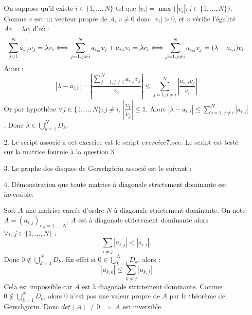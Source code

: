 \documentclass[a4paper,11pt]{article}
\begin{document}
	On suppose qu'il existe $i \in \{1, ..., N\}$ tel que $|v_{i}| = \max \{ |v_{j}| : j \in \{1, ..., N\}\}$. Comme $v$ est un vecteur propre de $A$, $v \neq 0$ donc $|v_{i}| > 0$, et $v$ vérifie l'égalité $Av = \lambda v$, d'où :
	\begin{equation*}
		\sum_{j = 1}^{N} a_{i, j} v_{j} = \lambda v_{i}
		\Longleftrightarrow \sum_{j = 1, j \neq i}^{N} a_{i, j} v_{j} + a_{i, i} v_{i}= \lambda v_{i} \\
		\Longleftrightarrow \sum_{j = 1, j \neq i}^{N} a_{i, j} v_{j} = (\lambda - a_{i, i}) v_{i}
	\end{equation*}
	Ainsi :
	\begin{equation*}
		|\lambda - a_{i, i}| = \left|\frac{\sum\limits_{j = 1, j \neq i}^{N} a_{i, j} v_{j}}{v_{i}} \right|
		\leqslant \sum_{j = 1, j \neq i}^{N} \left|\frac{a_{i, j} v_{j}}{v_{i}} \right|
	\end{equation*}
	Or par hypothèse $\forall j \in \{1, ..., N\} : j \neq i$, $\left|\dfrac{v_{i}}{v_{j}}\right| \leqslant 1$.
	Alors $|\lambda - a_{i, i}| \leqslant \sum\limits_{j = 1, j \neq i}^{N} |a_{i, j}|$. \newline
	Donc $\lambda \in \bigcup\limits_{k=1}^{N} D_{k}$.
	
	
	2. Le script associé à cet exercice est le script $exercice7.sce$. Le script est testé sur la matrice fournie à la question 3.
	
	
	3. Le graphe des disques de Gerschgörin associé est le suivant :
	

	4. Démonstration que toute matrice à diagonale strictement dominante est inversible:

	Soit $A$ une matrice carrée d'ordre $N$ à diagonale strictement dominante. On note $A = (a_{i,j})_{i,j=1,...,N}$.
	$A$ est à diagonale strictement dominante alors $\forall i, j \in \{1, ..., N\}$ :
	\begin{equation*}
		\sum\limits_{i \neq j} |a_{i, j}| < |a_{i, i}|.
	\end{equation*}
	Donc $0 \notin \bigcup\limits_{k=1}^{N} D_{k}$. En effet si $0 \in \bigcup\limits_{k=1}^{N} D_{k}$, alors :
	\begin{equation*}
		|a_{k, k}| \leqslant \sum\limits_{k \neq j} |a_{k, j}|
	\end{equation*}
	Cela est impossible car $A$ est à diagonale strictement dominante.
	Comme $0 \notin \bigcup\limits_{k=1}^{N} D_{k}$, alors $0$ n'est pas une valeur propre de $A$ par le théorème de Gerschgörin.
	Donc $det(A) \neq 0$ $\Longrightarrow$ $A$ est inversible.
\end{document}
